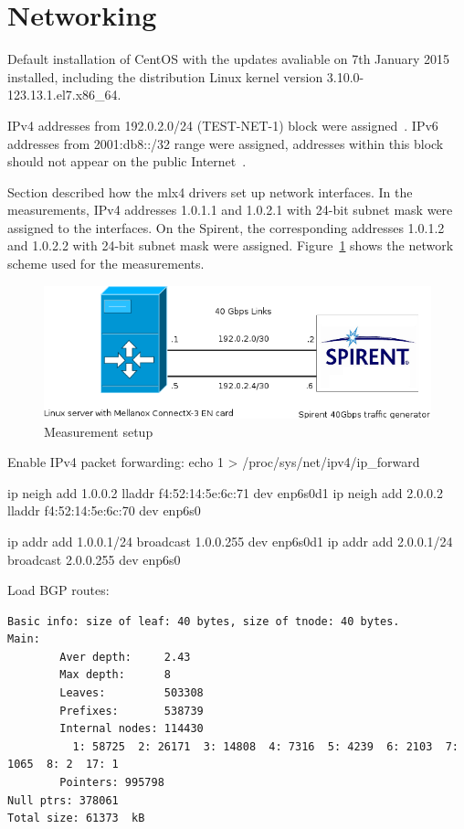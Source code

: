 
\section{Networking}\label{sec:setup-networking}
Default installation of CentOS with the updates avaliable on 7th January 2015 installed,
including the distribution Linux kernel version 3.10.0-123.13.1.el7.x86\_64.


IPv4 addresses from 192.0.2.0/24 (TEST-NET-1) block were assigned~\cite{rfc5737}.
IPv6 addresses from 2001:db8::/32 range were assigned,
addresses within this block should not appear on the public Internet~\cite{rfc3849}.

Section%
described how the mlx4 drivers set up network interfaces.
In the measurements, IPv4 addresses 1.0.1.1 and 1.0.2.1 with 24-bit subnet mask were assigned to the interfaces.
On the Spirent, the corresponding addresses 1.0.1.2 and 1.0.2.2 with 24-bit subnet mask were assigned.
Figure~\ref{fig:measurements-setup} shows the network scheme used for the measurements.
\begin{figure}[H]
	\centering
	\includegraphics[width=13.5cm,keepaspectratio]{fig/net-setup.png}
	\caption{Measurement setup}
	\label{fig:measurements-setup}
\end{figure}


Enable IPv4 packet forwarding:
echo 1 > /proc/sys/net/ipv4/ip\_forward


ip neigh add 1.0.0.2 lladdr f4:52:14:5e:6c:71 dev enp6s0d1
ip neigh add 2.0.0.2 lladdr f4:52:14:5e:6c:70 dev enp6s0

ip addr add 1.0.0.1/24 broadcast 1.0.0.255 dev enp6s0d1
ip addr add 2.0.0.1/24 broadcast 2.0.0.255 dev enp6s0


Load BGP routes:
\begin{lstlisting}
Basic info: size of leaf: 40 bytes, size of tnode: 40 bytes.
Main:
        Aver depth:     2.43
        Max depth:      8
        Leaves:         503308
        Prefixes:       538739
        Internal nodes: 114430
          1: 58725  2: 26171  3: 14808  4: 7316  5: 4239  6: 2103  7: 1065  8: 2  17: 1
        Pointers: 995798
Null ptrs: 378061
Total size: 61373  kB
\end{lstlisting}
